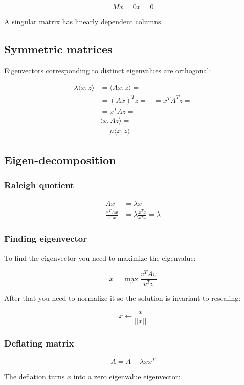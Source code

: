 	$$Mx = 0x = 0$$

	A singular matrix has linearly dependent columns.

	\subsection{Symmetric matrices}
	Eigenvectors corresponding to distinct eigenvalues are orthogonal:

	\begin{align*}
		\lambda\langle x, z\rangle &= \langle Ax, z\rangle=\\
					   &=(Ax)^Tz=
					   &=x^TA^Tz=\\
					   &=x^TAz=\\
					   &\langle x, Az\rangle=\\
					   &=\mu\langle x, z\rangle
	\end{align*}

	\subsection{Eigen-decomposition}

		\subsubsection{Raleigh quotient}

		\begin{align*}
			Ax &=\lambda x\\
			\frac{x^TAx}{x^Tx} &=\lambda\frac{x^Tx}{x^Tx} = \lambda
		\end{align*}

		\subsubsection{Finding eigenvector}
		To find the eigenvector you need to maximize the eigenvalue:

		$$x = \max\limits_v\frac{v^TAv}{v^Tv}$$

		After that you need to normalize it so the solution is invariant to rescaling:

		$$x\leftarrow\frac{x}{||x||}$$

		\subsubsection{Deflating matrix}

		$$\bar{A} = A - \lambda xx^T$$

		The deflation turns $x$ into a zero eigenvalue eigenvector:

